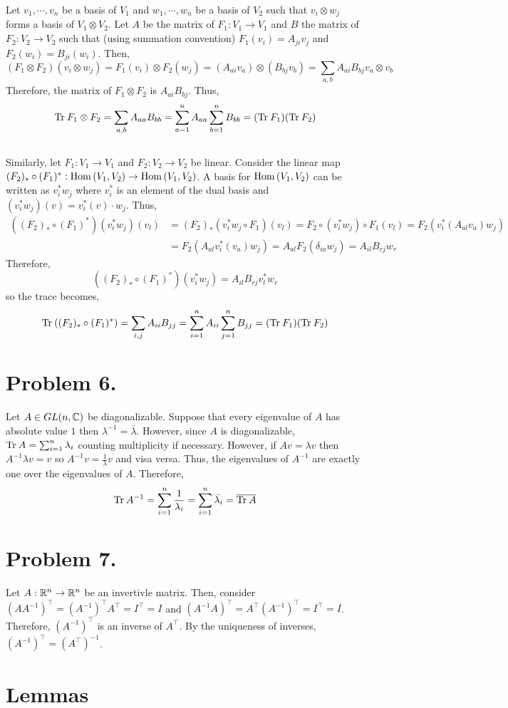 \documentclass[12pt]{extarticle}
\begin{document}
Let $v_1, \cdots, v_n$ be a basis of $V_1$ and $w_1, \cdots, w_n$ be a basis of $V_2$ such that $v_i \otimes w_j$ forms a basis of $V_1 \otimes V_2$. Let $A$ be the matrix of $F_1 : V_1 \to V_1$ and $B$ the matrix of $F_2 : V_2 \to V_2$ such that (using summation convention) $F_1(v_i) = A_{ji}v_j$ and $F_2(w_i) = B_{ji}(w_i)$. Then, 
\[(F_1 \otimes F_2)(v_i \otimes w_j) = F_1(v_i) \otimes F_2(w_j) = (A_{ai} v_a) \otimes (B_{bj} v_b) = \sum_{a, b} A_{ai} B_{bj} v_a \otimes v_b\]
Therefore, the matrix of $F_1 \otimes F_2$ is $A_{ai}B_{bj}$. Thus, 
\[ \mathrm{Tr} \: F_1 \otimes F_2 = \sum_{a,b} A_{aa}B_{bb} = \sum_{a = 1}^n A_{aa} \sum_{b = 1}^n B_{bb} = (\mathrm{Tr} \: F_1) (\mathrm{Tr} \: F_2) \] 
\bigskip \\
Similarly, let $F_1 : V_1 \to V_1$ and $F_2 : V_2 \to V_2$ be linear. Consider the linear map $(F_2)_* \circ (F_1)^* : \mathrm{Hom}\left( V_1, V_2 \right) \to \mathrm{Hom}\left( V_1, V_2 \right)$. A basis for $\mathrm{Hom}\left( V_1, V_2 \right)$ can be written as $v_i^* w_j$ where $v_i^*$ is an element of the dual basis and $(v_i^* w_j)(v) = v_i^*(v) \cdot w_j$. Thus,
\begin{align*}
((F_2)_* \circ (F_1)^*)(v_i^* w_j)(v_l) & = (F_2)_*(v_i^* w_j \circ F_1)(v_l) = F_2 \circ (v_i^* w_j) \circ F_1(v_l) = F_2(v_i^*(A_{al} v_a) w_j) 
\\
& = F_2(A_{al} v_i^*(v_a) w_j) = A_{al} F_2(\delta_{ia} w_j) = A_{il} B_{rj}w_r 
\end{align*}
Therefore,
\[ ((F_2)_* \circ (F_1)^*)(v_i^* w_j) = A_{il} B_{rj} v^*_l w_r\]
so the trace becomes,
\[ \mathrm{Tr} \:  ((F_2)_* \circ (F_1)^*) = \sum_{i, j} A_{ii} B_{jj} = \sum_{i = 1}^{n} A_{ii} \sum_{j = 1}^n B_{jj} = (\mathrm{Tr} \: F_1) (\mathrm{Tr} \: F_2) \] 

\section*{Problem 6.}

Let $A \in GL(n, \mathbb{C})$ be diagonalizable. Suppose that every eigenvalue of $A$ has absolute value $1$ then $\lambda^{-1} = \bar{\lambda}$. However, since $A$ is diagonalizable, $\mathrm{Tr} \: A = \sum_{i = 1}^n \lambda_i$ counting multiplicity if necessary. However, if $A v = \lambda v$ then $A^{-1} \lambda v = v$ so $A^{-1} v = \frac{1}{\lambda}v$ and visa versa. Thus, the eigenvalues of $A^{-1}$ are exactly one over the eigenvalues of $A$. Therefore, 
\[\mathrm{Tr} \: A^{-1} = \sum_{i = 1}^n \frac{1}{\lambda_i} = \sum_{i = 1}^n \bar{\lambda_i} = \overline{\mathrm{Tr} \: A}\]

\section*{Problem 7.}
Let $A : \mathbb{R}^n \to \mathbb{R}^n$ be an invertivle matrix. Then, consider $(A A^{-1})^\top = (A^{-1})^\top A^\top = I^\top = I$ and $(A^{-1} A)^\top = A^\top (A^{-1})^\top = I^\top = I$. Therefore, $(A^{-1})^\top$ is an inverse of $A^\top$. By the uniqueness of inverses, $(A^{-1})^\top = (A^\top)^{-1}$. 
\section*{Lemmas}
\end{document}
